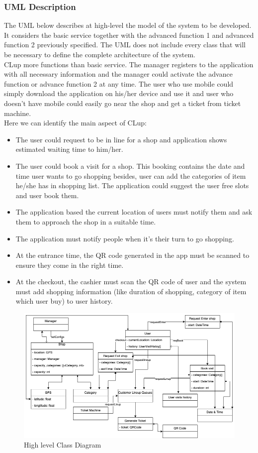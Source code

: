 \subsubsection{UML Description}
The UML below describes at high-level the model of the system to be developed. It considers the basic service together with the advanced function 1 and advanced function 2 previously specified. The UML does not include every class that will be necessary to define the complete architecture of the system.\\
CLup more functions than basic service. The manager registers to the application with all necessary information and the manager could activate the advance function or advance function 2 at any time. The user who use mobile could simply download the application on his/her device and use it and user who doesn't have mobile could easily go near the shop and get a ticket from ticket machine.\\
Here we can identify the main aspect of CLup:
\begin{itemize}
    \item The user could request to be in line for a shop and application shows estimated waiting time to him/her.
    \item The user could book a visit for a shop. This booking contains the date and time user wants to go shopping besides, user can add the categories of item he/she has in shopping list. The application could suggest the user free slots and user book them.
    \item The application based the current location of users must notify them and ask them to approach the shop in a suitable time.
    \item The application must notify people when it's their turn to go shopping.
    \item At the entrance time, the QR code generated in the app must be scanned to ensure they come in the right time.
    \item At the checkout, the cashier must scan the QR code of user and the system must add shopping information (like duration of shopping, category of item which user buy) to user history.
\end{itemize}

\begin{figure}[H]
  \includegraphics[width=\textwidth,height=\textheight,keepaspectratio]{images/ClassDiagram.png}
  \caption{High level Class Diagram}
\end{figure}